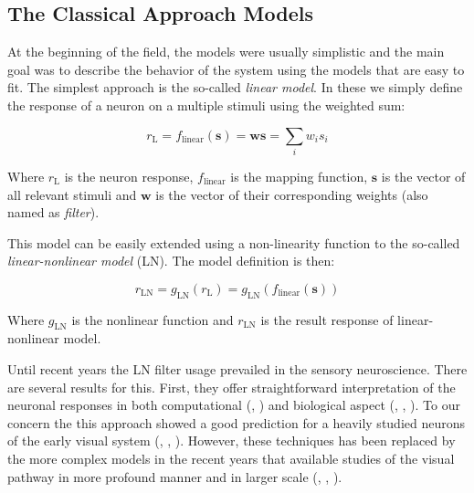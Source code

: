 \subsection{The Classical Approach Models}
\label{subsec:classical_approach}
At the beginning of the field, the models were usually
simplistic and the main goal was to describe the behavior of the system using the models
that are easy to fit. The simplest approach is the so-called \emph{linear model}. In these we simply define the response of a neuron on a multiple stimuli using the weighted sum:

$$r_{\text{L}} = f_{\text{linear}}(\boldsymbol{s}) = \boldsymbol{w}\boldsymbol{s} = \sum_{i} w_i s_i$$

Where $r_{\text{L}}$ is the neuron response, $f_{\text{linear}}$ is the mapping function, 
$\boldsymbol{s}$ is the vector of all relevant stimuli and $\boldsymbol{w}$ is the
vector of their corresponding weights (also named as \emph{filter}).

This model can be easily extended using a non-linearity function to the 
so-called \emph{linear-nonlinear model} (LN). The model definition is then:

$$r_{\text{LN}} = g_{\text{LN}}(r_{\text{L}}) = g_{\text{LN}}(f_{\text{linear}}(\boldsymbol{s}))$$

Where $g_{\text{LN}}$ is the nonlinear function and $r_{\text{LN}}$ is the result response of linear-nonlinear model.

Until recent years the LN filter usage prevailed in the sensory neuroscience. There are several results for this. First, they offer straightforward interpretation of the neuronal responses in both computational (\citet{hubel1965receptive}, \citet{movshon1978receptive}) and biological aspect (\citet{mohanty2012membrane}, \citet{SHAPLEY2009907}, \citet{poirazi2003pyramidal}). To our concern the this approach showed a good prediction for a heavily studied neurons of the early visual system (\citet{SHAPLEY2009907}, \citet{baccus2002fast}, \citet{Carandini10577}). However, these techniques has been replaced by the more complex models in the recent years that available studies of the visual pathway in more profound manner and in larger scale (\citet{Maheswaranathan340943}, \citet{Butts11313}, \citet{keat2001predicting}).


